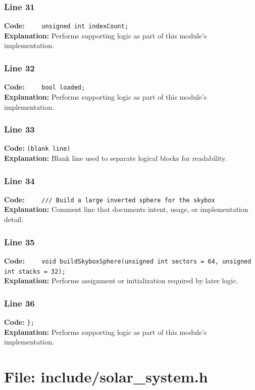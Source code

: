 \documentclass[11pt,a4paper]{article}
\begin{document}
\subsubsection*{Line 31}
\textbf{Code:} \verb|    unsigned int indexCount;|\\
\textbf{Explanation:} Performs supporting logic as part of this module's implementation.

\subsubsection*{Line 32}
\textbf{Code:} \verb|    bool loaded;|\\
\textbf{Explanation:} Performs supporting logic as part of this module's implementation.

\subsubsection*{Line 33}
\textbf{Code:} \texttt{(blank line)}\\
\textbf{Explanation:} Blank line used to separate logical blocks for readability.

\subsubsection*{Line 34}
\textbf{Code:} \verb|    /// Build a large inverted sphere for the skybox|\\
\textbf{Explanation:} Comment line that documents intent, usage, or implementation detail.

\subsubsection*{Line 35}
\textbf{Code:} \verb|    void buildSkyboxSphere(unsigned int sectors = 64, unsigned int stacks = 32);|\\
\textbf{Explanation:} Performs assignment or initialization required by later logic.

\subsubsection*{Line 36}
\textbf{Code:} \verb|};|\\
\textbf{Explanation:} Performs supporting logic as part of this module's implementation.

\newpage
\section{File: include/solar\_system.h}
\end{document}
